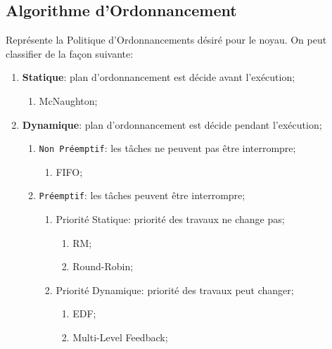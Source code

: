 \documentclass{article}
\begin{document}
\subsection{Algorithme d'Ordonnancement}
\begin{definition}\label{def:algorithmeOrdonnancement}
    Représente la Politique d'Ordonnancements désiré pour le noyau. On peut classifier de la façon suivante:
    \begin{enumerate}
        \item \textbf{Statique}: plan d'ordonnancement est décide avant l'exécution;
        \begin{enumerate}[noitemsep]
            \item McNaughton;
        \end{enumerate}
        \item \textbf{Dynamique}: plan d'ordonnancement est décide pendant l'exécution;
        \begin{enumerate}[noitemsep]
            \item \texttt{Non Préemptif}: les tâches ne peuvent pas être interrompre;
            \begin{enumerate}[noitemsep]
                \item FIFO;
            \end{enumerate}
            \item \texttt{Préemptif}: les tâches peuvent être interrompre;
            \begin{enumerate}
                \item Priorité Statique: priorité des travaux ne change pas;
                \begin{enumerate}[noitemsep]
                    \item RM;
                    \item Round-Robin;
                \end{enumerate}
                \item Priorité Dynamique: priorité des travaux peut changer;
                \begin{enumerate}[noitemsep]
                    \item EDF;
                    \item Multi-Level Feedback;
                \end{enumerate}
            \end{enumerate}
        \end{enumerate}

    \end{enumerate}
\end{definition}
    
\end{document}
